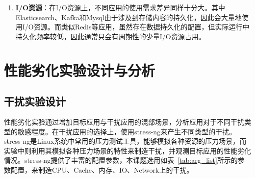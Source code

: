 \begin{enumerate}
\begin{figure}[H]
    \centering
    \begin{subfigure}[b]{0.85\textwidth}
      \texttt{[image: profile\_elasticsearch]}
      \caption{Elasticsearch资源使用}
      \label{fig:profile_elasticsearch}
    \end{subfigure}
    \begin{subfigure}[b]{0.85\textwidth}
        \texttt{[image: profile\_render]}
        \caption{Render资源使用}
        \label{fig:profile_render}
    \end{subfigure}
\label{fig:resource_affinity_2}
\end{figure}
    
    \item \textbf{I/O资源}：在I/O资源上，不同应用的使用需求差异同样十分大。其中Elasticsearch、Kafka和Mysql由于涉及到存储内容的持久化，因此会大量地使用I/O资源。而类似Redis等应用，虽然存在数据持久化的配置，但实际运行中持久化频率较低，因此通常只会有周期性的少量I/O资源占用。
\end{enumerate}

\section{性能劣化实验设计与分析}

\subsection{干扰实验设计}


性能劣化实验通过增加目标应用与干扰应用的混部场景，分析应用对于不同干扰类型的敏感程度。在干扰应用的选择上，使用stress-ng来产生不同类型的干扰。stress-ng是Linux系统中常用的压力测试工具，能够模拟各种资源的压力场景，而实验中则利用其模拟各种压力场景的特性来制造干扰，并观测目标应用的性能劣化情况。stress-ng提供了丰富的配置参数，本课题选用如表~\ref{tab:arg_list}所示的参数配置，来制造CPU、Cache、内存、IO、Network上的干扰。

